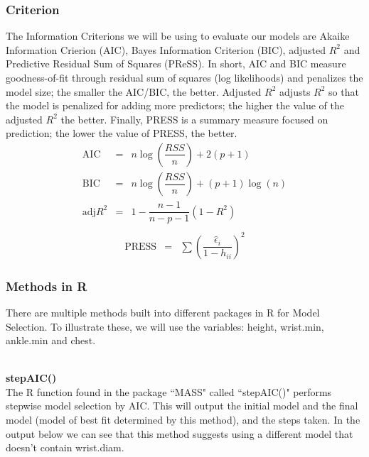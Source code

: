 \documentclass[11pt]{article}\usepackage[]{graphicx}\usepackage[]{color}
\begin{document}
\subsubsection{Criterion}

The Information Criterions we will be using to evaluate our models are Akaike Information Crierion (AIC), Bayes Information Criterion (BIC), adjusted $R^2$ and Predictive Residual Sum of Squares (PReSS). In short, AIC and BIC measure goodness-of-fit through residual sum of squares (log likelihoods) and penalizes the model size; the smaller the AIC/BIC, the better. Adjusted $R^2$ adjusts $R^2$ so that the model is penalized for adding more predictors; the higher the value of the adjusted $R^2$ the better. Finally, PRESS is a summary measure focused on prediction; the lower the value of PRESS, the better.
\begin{eqnarray*}
\text{AIC} &=& n\log \left(\dfrac{RSS}{n}\right) + 2(p +1)\\
\text{BIC} &=& n\log \left(\dfrac{RSS}{n}\right) + (p + 1) \log(n)\\
\text{adj}R^2 &=& 1 - \dfrac{n - 1}{n - p - 1}(1 - R^2)\\
\end{eqnarray*}
\begin{eqnarray*}
\text{PRESS} &=& \sum{\left(\dfrac{\hat{\epsilon}_i}{1 - h_{ii}}\right)^2}
\end{eqnarray*}

\subsubsection{Methods in R}

There are multiple methods built into different packages in R for Model Selection. To illustrate these, we will use the variables:  height, wrist.min, ankle.min and chest.



\\

\textbf{stepAIC()}\\

The R function found in the package ``MASS" called ``stepAIC()" performs stepwise model selection by AIC. This will output the initial model and the final model (model of best fit determined by this method), and the steps taken. In the output below we can see that this method suggests using a different model that doesn't contain wrist.diam.\\
\end{document}
